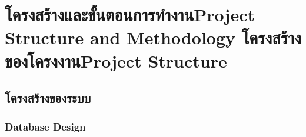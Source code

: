\chapter{\ifproject%
\ifcpe โครงสร้างและขั้นตอนการทำงาน\else Project Structure and Methodology\fi
\else%
\ifcpe โครงสร้างของโครงงาน\else Project Structure\fi
\fi
}



\makeatletter


\makeatother



\section{โครงสร้างของระบบ}



\subsection{Database Design}

